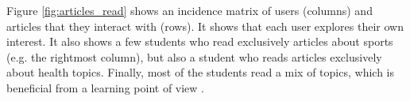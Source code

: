 Figure \ref{fig:articles_read} shows an incidence matrix of users (columns) and articles that they interact with (rows). It shows that each user explores their own interest.
% 
% 
It also shows a few students who read exclusively articles about sports (e.g. the rightmost column), but also a student who reads articles exclusively about health topics. Finally, most of the students read a mix of topics, which is beneficial from a learning point of view \cite{renadya07-power}.


  

